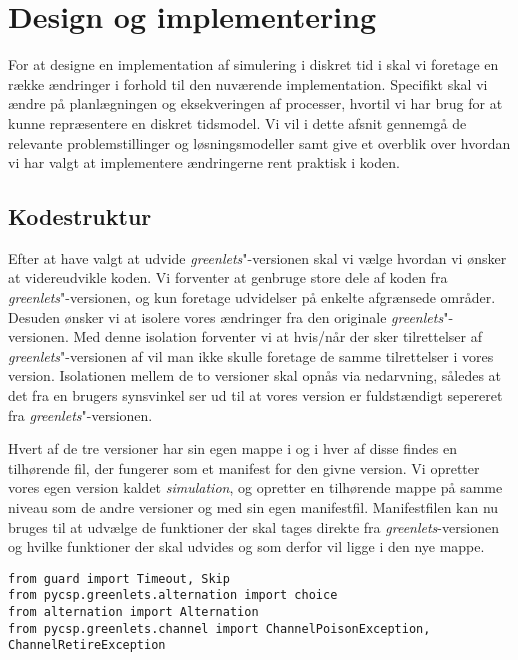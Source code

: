
\section{Design og implementering}
For at designe en implementation af simulering i diskret tid i \pycsp skal vi foretage en række ændringer i forhold til den nuværende implementation. Specifikt skal vi ændre på planlægningen og eksekveringen af processer, hvortil vi har brug for at kunne repræsentere en diskret tidsmodel. Vi vil i dette afsnit gennemgå de relevante problemstillinger og løsningsmodeller samt give et overblik over hvordan vi har valgt at implementere ændringerne rent praktisk i koden. 


\subsection{Kodestruktur}  
Efter at have valgt at udvide \emph{greenlets}"-versionen skal vi vælge hvordan vi ønsker at videreudvikle koden. Vi forventer at genbruge store dele af koden fra \emph{greenlets}"-versionen, og kun foretage udvidelser på enkelte afgrænsede områder. Desuden ønsker vi at isolere vores ændringer fra den originale \emph{greenlets}"-versionen. Med denne isolation forventer vi at hvis/når der sker tilrettelser af \emph{greenlets}"-versionen af \pycsp vil man ikke skulle foretage de samme tilrettelser i vores version. 
Isolationen mellem de to versioner skal opnås via nedarvning, således at det fra en brugers synsvinkel ser ud til at vores version er fuldstændigt sepereret fra \emph{greenlets}"-versionen.

Hvert af de tre versioner har sin egen mappe i \pycsp og i hver af disse findes en tilhørende  fil, der fungerer som et manifest for den givne version. Vi opretter vores egen version kaldet \emph{simulation}, og opretter en tilhørende mappe på samme niveau som de andre versioner og med sin egen manifestfil. Manifestfilen kan nu bruges til at udvælge de funktioner der skal tages direkte fra \emph{greenlets}-versionen og hvilke funktioner der skal udvides og som derfor vil ligge i den nye mappe.
\begin{lstlisting}[float=hbtp,label=fig:init,caption=Uddrag af \code{\_\_init\_\_.py} for simulationsversionen.]
from guard import Timeout, Skip
from pycsp.greenlets.alternation import choice
from alternation import Alternation
from pycsp.greenlets.channel import ChannelPoisonException, ChannelRetireException
\end{lstlisting}

